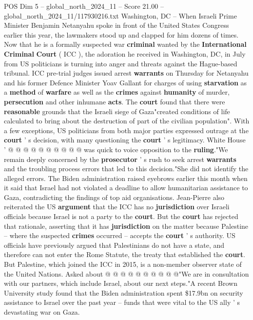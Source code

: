 \begin{textsample}{POS Dim 5 – global\_north\_2024\_11 – Score 21.00 – global\_north\_2024\_11/117930216.txt}  \label{ex:f5_pos_038}
Washington, DC -- When Israeli Prime Minister Benjamin Netanyahu spoke in front of the United States Congress earlier this year, the lawmakers stood up and clapped for him dozens of times.
Now that he is a formally suspected war \textbf{criminal} wanted by the \textbf{International} \textbf{Criminal} \textbf{Court} ( ICC ), the adoration he received in Washington, DC, in July from US politicians is turning into anger and threats against the Hague-based tribunal.
ICC pre-trial judges issued arrest \textbf{warrants} on Thursday for Netanyahu and his former Defence Minister Yoav Gallant for charges of using \textbf{starvation} as a \textbf{method} of \textbf{warfare} as well as the \textbf{crimes} against \textbf{humanity} of murder, \textbf{persecution} and other inhumane \textbf{acts}.
The \textbf{court} found that there were \textbf{reasonable} grounds that the Israeli siege of Gaza"created conditions of life calculated to bring about the destruction of part of the civilian population".
With a few exceptions, US politicians from both major parties expressed outrage at the \textbf{court} ' s decision, with many questioning the \textbf{court} ' s legitimacy.
White House ' @ @ @ @ @ @ @ @ @ @ was quick to voice opposition to the \textbf{ruling}."We remain deeply concerned by the \textbf{prosecutor} ' s rush to seek arrest \textbf{warrants} and the troubling process errors that led to this decision."She did not identify the alleged errors.
The Biden administration raised eyebrows earlier this month when it said that Israel had not violated a deadline to allow humanitarian assistance to Gaza, contradicting the findings of top aid organisations.
Jean-Pierre also reiterated the US \textbf{argument} that the ICC has no \textbf{jurisdiction} over Israeli officials because Israel is not a party to the \textbf{court}.
But the \textbf{court} has rejected that rationale, asserting that it has \textbf{jurisdiction} on the matter because Palestine -- where the suspected \textbf{crimes} occurred -- accepts the \textbf{court} ' s authority.
US officials have previously argued that Palestinians do not have a state, and therefore can not enter the Rome Statute, the treaty that established the \textbf{court}.
But Palestine, which joined the ICC in 2015, is a non-member observer state of the United Nations.
Asked about @ @ @ @ @ @ @ @ @ @"We are in consultation with our partners, which include Israel, about our next steps."A recent Brown University study found that the Biden administration spent \$17.9bn on security assistance to Israel over the past year -- funds that were vital to the US ally ' s devastating war on Gaza.

\end{textsample}
